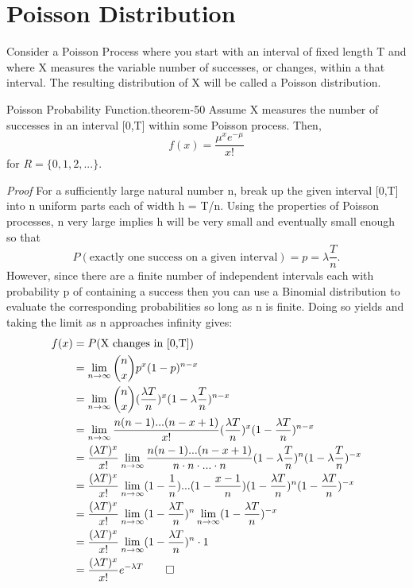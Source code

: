 \documentclass[10pt,]{book}
\makeatletter
\renewcommand*{\proofname}{Proof}
\renewenvironment{proof}[1][\proofname]{\par
  \pushQED{\qed}%
  \normalfont \topsep6\p@\@plus6\p@\relax
  \trivlist
  \item\relax
    {\itshape
    #1\@addpunct{.}}\hspace\labelsep\ignorespaces
}{%
  \popQED\endtrivlist\@endpefalse
}
\numberwithin{equation}{section}
\makeatother
\begin{document}
\section[{Poisson Distribution}]{Poisson Distribution}\label{section-52}
\hypertarget{p-948}{}%
Consider a Poisson Process where you start with an interval of fixed length T and where X measures the variable number of successes, or changes, within a that interval. The resulting distribution of X will be called a Poisson distribution.%
\par
\hypertarget{p-949}{}%
\begin{theorem}{Poisson Probability Function.}{}{theorem-50}%
\hypertarget{p-950}{}%
Assume X measures the number of successes in an interval [0,T] within some Poisson process. Then,%
\begin{equation*}
f(x) = \frac{\mu^x e^{-\mu}}{x!}
\end{equation*}
for \(R = \{ 0, 1, 2, ... \}\).%
\end{theorem}
\begin{proof}\hypertarget{proof-52}{}
\hypertarget{p-951}{}%
For a sufficiently large natural number n, break up the given interval [0,T] into n uniform parts each of width h = T/n.  Using the properties of Poisson processes, n very large implies h will be very small and eventually small enough so that%
\begin{equation*}
P(\text{exactly one success on a given interval}) = p = \lambda \frac{T}{n}.
\end{equation*}
However, since there are a finite number of independent intervals each with probability p of containing a success then you can use a Binomial distribution to evaluate the corresponding probabilities so long as n is finite. Doing so yields and taking the limit as n approaches infinity gives:%
\begin{align*}
f(x) & = P(\text{X changes in [0,T]}) \\
& = \lim_{n \rightarrow \infty} \binom{n}{x} p^x (1-p)^{n-x}\\
& = \lim_{n \rightarrow \infty} \binom{n}{x} (\frac{\lambda T}{n})^x (1-\lambda \frac{T}{n})^{n-x}\\
& = \lim_{n \rightarrow \infty} \frac{n(n-1)...(n-x+1)}{x!} ( \frac{\lambda T}{n})^x (1- \frac{\lambda T}{n})^{n-x}\\
& = \frac{(\lambda T)^x}{x!} \lim_{n \rightarrow \infty} \frac{n(n-1)...(n-x+1)}{n \cdot n \cdot ... \cdot n} (1-\lambda \frac{T}{n})^{n}(1-\lambda \frac{T}{n})^{-x}\\
& = \frac{(\lambda T)^x}{x!} \lim_{n \rightarrow \infty} (1-\frac{1}{n})...(1-\frac{x-1}{n})  (1- \frac{\lambda T}{n})^{n}(1- \frac{\lambda T}{n})^{-x}\\
& = \frac{(\lambda T)^x}{x!} 
\lim_{n \rightarrow \infty} (1- \frac{\lambda T}{n})^{n}
\lim_{n \rightarrow \infty} (1- \frac{\lambda T}{n})^{-x}\\
& = \frac{(\lambda T)^x}{x!} 
\lim_{n \rightarrow \infty} (1- \frac{\lambda T}{n})^{n} \cdot 1\\
& = \frac{(\lambda T)^x}{x!} 
e^{-\lambda T}\qedhere
\end{align*}
%
\end{proof}
\end{document}
